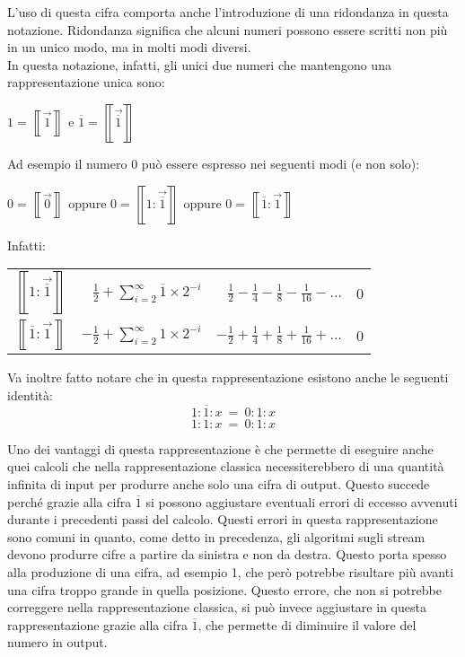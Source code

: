 \documentclass[Lau,oneside]{sapthesis}
\begin{document}
L'uso di questa cifra comporta anche l'introduzione di una ridondanza in questa 
notazione. Ridondanza significa che alcuni numeri possono essere scritti non più 
in un unico modo, ma in molti modi diversi.\\
In questa notazione, infatti, gli unici due numeri che mantengono una 
rappresentazione unica sono:
\begin{center}
$1=\left\llbracket\overrightarrow{1}\right\rrbracket$ \hspace{0.5cm} e 
\hspace{0.5cm} 
$\overline{1}=\left\llbracket\overrightarrow{\overline{1}}\right\rrbracket$
\end{center}
Ad esempio il numero 0 può essere espresso nei seguenti modi (e non solo):
\begin{center}
$0=\left\llbracket\overrightarrow{0}\right\rrbracket$ \hspace{0.5cm} oppure 
\hspace{0.5cm} 
$0=\left\llbracket1:\overrightarrow{\overline{1}}\right\rrbracket$ 
\hspace{0.5cm} oppure \hspace{0.5cm}
$0=\left\llbracket\overline{1}:\overrightarrow{1}\right\rrbracket$\\
\end{center}
Infatti:
\begin{center}
\def\arraystretch{3}
\begin{tabular}{c@{ = }r@{ = }r@{ = }c}
$\displaystyle \left\llbracket 1:\overrightarrow{\overline{1}} \right\rrbracket$ &
$\displaystyle \frac{1}{2}+\sum_{i=2}^{\infty}\overline{1} \times 2^{-i}$ &
$\displaystyle \frac{1}{2}-\frac{1}{4}-\frac{1}{8}-\frac{1}{16}-\ldots$ &
0\\
$\displaystyle \left\llbracket \overline{1}:\overrightarrow{1} \right\rrbracket$ &
$\displaystyle -\frac{1}{2}+\sum_{i=2}^{\infty} 1 \times 2^{-i}$ &
$\displaystyle -\frac{1}{2}+\frac{1}{4}+\frac{1}{8}+\frac{1}{16}+\ldots$ &
0
\end{tabular}
\end{center}

Va inoltre fatto notare che in questa rappresentazione esistono anche le seguenti identità:
$$1:\overline{1}:x\ =\ 0:1:x$$
$$\overline{1}:1:x\ =\ 0:\overline{1}:x$$

Uno dei vantaggi di questa rappresentazione è che permette di eseguire anche quei 
calcoli che nella rappresentazione classica necessiterebbero di una quantità 
infinita di input per produrre anche solo una cifra di output. Questo succede 
perché grazie alla cifra $\overline{1}$ si possono aggiustare eventuali errori di eccesso avvenuti durante i precedenti passi del calcolo. Questi errori in questa rappresentazione sono comuni in quanto, come detto in precedenza, gli algoritmi sugli stream devono produrre cifre a partire da sinistra e non da destra. Questo porta spesso alla produzione di una cifra, ad esempio 1, che però potrebbe risultare più avanti una cifra troppo grande in quella posizione. Questo errore, che non si potrebbe correggere nella rappresentazione classica, si può invece aggiustare in questa rappresentazione grazie alla cifra $\overline{1}$, che permette di diminuire il valore del numero in output.
\end{document}
